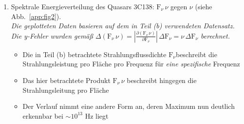 \documentclass[11pt,a4paper]{scrartcl}
\newcommand*{\figref}[1]{(siehe Abb.~\ref{#1})}
\newcommand{\Fnu}{\ensuremath{\mathrm{F}_{\nu}}}
\begin{document}
\begin{enumerate}[label=\textbf{\large(\alph*)}]
\vspace*{\baselineskip}

\item
Spektrale Energieverteilung des Quasars 3C138: $\Fnu\,\nu$
gegen $\nu$ \figref{app:fig2}. \\
\textit{\small Die geplotteten Daten basieren auf dem in Teil (b)
    verwendeten Datensatz. Die y-Fehler wurden gemäß
    $\Delta\left(\Fnu\,\nu\right) = \left|
    \frac{\partial(\Fnu\,\nu)}{\partial \Fnu} \right|\,\Delta\Fnu =
    \nu\,\Delta\Fnu$ berechnet.}

    \begin{itemize}
        \item Die in Teil (b) betrachtete Strahlungsflussdichte
            \Fnu beschreibt die Strahlungsleistung pro Fläche
            pro Frequenz für \emph{eine spezifische} Frequenz
        \item Das hier betrachtete Produkt $\Fnu\,\nu$
            beschreibt hingegen die Strahlungsleitung pro Fläche


        \item Der Verlauf nimmt eine andere Form an, deren Maximum nun
            deutlich erkennbar bei $\sim 10^{13}$ \si{\hertz} liegt
    \end{itemize}

\end{enumerate}

\newpage


\end{document}
